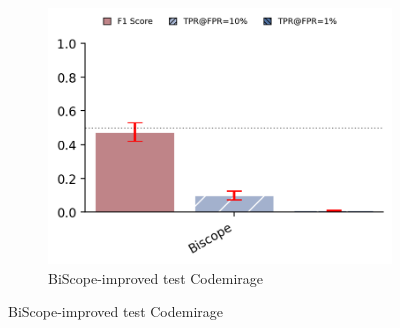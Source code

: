 \begin{figure}[H]
\begin{subfigure}[b]{0.4\textwidth}
        \includegraphics[width=\linewidth]{img/TEST/BiScope/eeb.png}
        \caption{BiScope-improved test Codemirage}
        \label{fig:ab1}
    \end{subfigure}
\end{figure}




